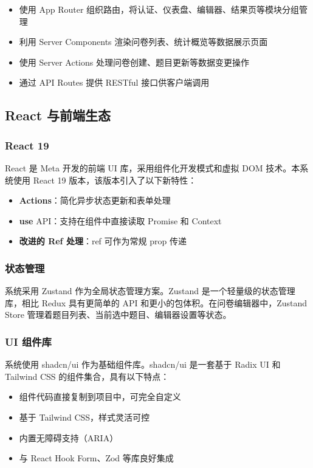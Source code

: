 \begin{itemize}
  \item 使用 App Router 组织路由，将认证、仪表盘、编辑器、结果页等模块分组管理
  \item 利用 Server Components 渲染问卷列表、统计概览等数据展示页面
  \item 使用 Server Actions 处理问卷创建、题目更新等数据变更操作
  \item 通过 API Routes 提供 RESTful 接口供客户端调用
\end{itemize}

\subsection{React 与前端生态}

\subsubsection{React 19}

React 是 Meta 开发的前端 UI 库，采用组件化开发模式和虚拟 DOM 技术。本系统使用 React 19 版本，该版本引入了以下新特性：

\begin{itemize}
  \item \textbf{Actions}：简化异步状态更新和表单处理
  \item \textbf{use} API：支持在组件中直接读取 Promise 和 Context
  \item \textbf{改进的 Ref 处理}：ref 可作为常规 prop 传递
\end{itemize}

\subsubsection{状态管理}

系统采用 Zustand 作为全局状态管理方案。Zustand 是一个轻量级的状态管理库，相比 Redux 具有更简单的 API 和更小的包体积。在问卷编辑器中，Zustand Store 管理着题目列表、当前选中题目、编辑器设置等状态。

\subsubsection{UI 组件库}

系统使用 shadcn/ui 作为基础组件库。shadcn/ui 是一套基于 Radix UI 和 Tailwind CSS 的组件集合，具有以下特点：

\begin{itemize}
  \item 组件代码直接复制到项目中，可完全自定义
  \item 基于 Tailwind CSS，样式灵活可控
  \item 内置无障碍支持（ARIA）
  \item 与 React Hook Form、Zod 等库良好集成
\end{itemize}

